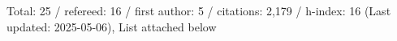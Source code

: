 Total: 25 / refereed: 16 / first author: 5 / citations: 2,179 / h-index: 16 (Last updated: 2025-05-06), List attached below